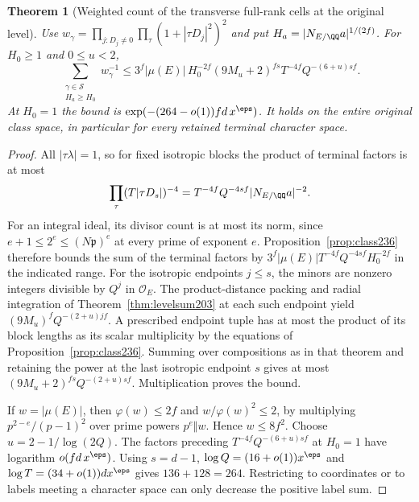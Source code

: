 \documentclass[a4paper,11pt]{article}
\newtheorem{theorem}[proposition]{Theorem}
\theoremstyle{definition}
\theoremstyle{remark}
\numberwithin{equation}{section}
\begin{document}
\begin{theorem}[Weighted count of the transverse full-rank cells at the original level]
\leavevmode\label{thm:trans236}
Use \(w_\gamma=\prod_{j:D_j\ne0}\prod_\tau
(1+|\tau D_j|^2)^2\) and put
\(H_a=|N_{E/\QQ}a|^{1/(2f)}\). For \(H_0\ge1\) and \(0\le u<2\),
\[
 \sum_{\substack{\gamma\in\mathcal S\\H_a\ge H_0}}w_\gamma^{-1}
 \le 3^f|\mu(E)|\,H_0^{-2f}(9M_u+2)^{fs}
                          T^{-4f} Q^{-(6+u)sf}.
\]
At \(H_0=1\) the bound is
\(\exp(-(264-o(1))fd\,x^\eps)\). It holds on the entire
original class space, in particular for every retained
terminal character space.
\end{theorem}
\begin{proof}
All \(|\tau\lambda|=1\), so for fixed isotropic blocks the
product of terminal factors is at most
\[
 \prod_\tau(T|\tau D_s|)^{-4}
             =T^{-4f}Q^{-4sf}|N_{E/\QQ}a|^{-2}.
\]
For an integral ideal, its divisor count is at most its norm,
since \(e+1\le2^e\le(N\mathfrak p)^e\) at every prime of
exponent \(e\). Proposition~\ref{prop:class236} therefore
bounds the sum of the terminal factors by
\(3^f|\mu(E)|T^{-4f}Q^{-4sf}H_0^{-2f}\) in the indicated
range. For the isotropic endpoints \(j\le s\), the minors
are nonzero integers divisible by \(Q^j\) in \(\mathcal O_E\).
The product-distance packing and radial integration of
Theorem~\ref{thm:levelsum203} at each such endpoint yield
\((9M_u)^fQ^{-(2+u)jf}\). A prescribed endpoint tuple has
at most the product of its block lengths as its scalar
multiplicity by the equations of Proposition~\ref{prop:class236}.
Summing over compositions as in that theorem and retaining the
power at the last isotropic endpoint \(s\) gives at most
\((9M_u+2)^{fs}Q^{-(2+u)sf}\). Multiplication proves the bound.

If \(w=|\mu(E)|\), then \(\varphi(w)\le2f\) and
\(w/\varphi(w)^2\le2\), by multiplying
\(p^{2-e}/(p-1)^2\) over prime powers \(p^e\Vert w\).
Hence \(w\le8f^2\). Choose \(u=2-1/\log(2Q)\).
The factors preceding \(T^{-4f}Q^{-(6+u)sf}\) at \(H_0=1\)
have logarithm \(o(fd\,x^\eps)\). Using \(s=d-1\),
\(\log Q=(16+o(1))x^\eps\) and
\(\log T=(34+o(1))d x^\eps\) gives \(136+128=264\).
Restricting to coordinates or to labels meeting a character
space can only decrease the positive label sum.
\end{proof}
\end{document}
